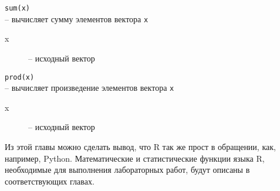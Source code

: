     \begin{mdframed}[style=BadassFrame]
        \texttt{sum(x)} \\
        -- вычисляет сумму элементов вектора \texttt{x}
        \begin{description}
           \item[x] -- исходный вектор
        \end{description}
    \end{mdframed}

    \begin{mdframed}[style=BadassFrame]
        \texttt{prod(x)} \\
        -- вычисляет произведение элементов вектора \texttt{x}
        \begin{description}
           \item[x] -- исходный вектор
        \end{description}
    \end{mdframed}

    \indent Из этой главы можно сделать вывод, что R так же прост в обращении, как, например, 
    Python. Математические и статистические функции языка R, необходимые для выполнения 
    лабораторных работ, будут описаны в соответствующих главах.
